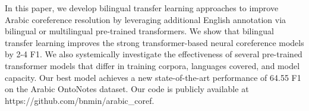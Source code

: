 In this paper, we develop bilingual transfer learning approaches to improve Arabic coreference resolution by leveraging additional English annotation via bilingual or multilingual pre-trained transformers. We show that bilingual transfer learning improves the strong transformer-based neural coreference models by 2-4 F1. We also systemically investigate the effectiveness of several pre-trained transformer models that differ in training corpora, languages covered, and model capacity. Our best model achieves a new state-of-the-art performance of 64.55 F1 on the Arabic OntoNotes dataset. Our code is publicly available at https://github.com/bnmin/arabic\_coref.
